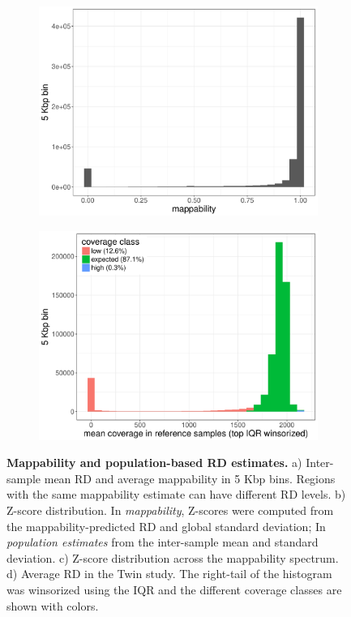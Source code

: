 \begin{figure}[htp]
  \begin{subfigure}[b]{.48\textwidth}
    \includegraphics[width=\linewidth, page=6]{figures/wgs-map-coverage-cohorts.pdf}
    \caption{}
    \label{fig:zmap}
  \end{subfigure}
  \begin{subfigure}[b]{.48\textwidth}
    \includegraphics[width=\linewidth, page=1]{figures/wgs-coverage-tracks.pdf}
    \caption{}
    \label{fig:covclass}
  \end{subfigure}

  \caption[Mappability and population-based RD estimates.]{{\bf Mappability and population-based RD estimates.} {\small a) Inter-sample mean RD and average mappability in 5 Kbp bins. Regions with the same mappability estimate can have different RD levels. b) Z-score distribution. In {\it mappability}, Z-scores were computed from the mappability-predicted RD and global standard deviation; In {\it population estimates} from the inter-sample mean and standard deviation. c) Z-score distribution across the mappability spectrum. d) Average RD in the Twin study. The right-tail of the histogram was winsorized using the IQR and the different coverage classes are shown with colors.}}

\end{figure}
